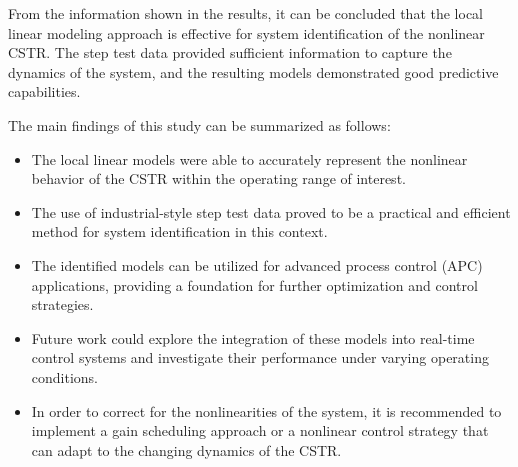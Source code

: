 From the information shown in the results, it can be concluded that the local linear modeling approach is effective for system identification of the nonlinear CSTR. The step test data provided sufficient information to capture the dynamics of the system, and the resulting models demonstrated good predictive capabilities.

The main findings of this study can be summarized as follows:

\begin{itemize}
    \item The local linear models were able to accurately represent the nonlinear behavior of the CSTR within the operating range of interest.
    \item The use of industrial-style step test data proved to be a practical and efficient method for system identification in this context.
    \item The identified models can be utilized for advanced process control (APC) applications, providing a foundation for further optimization and control strategies.
    \item Future work could explore the integration of these models into real-time control systems and investigate their performance under varying operating conditions.
    \item In order to correct for the nonlinearities of the system, it is recommended to implement a gain scheduling approach or a nonlinear control strategy that can adapt to the changing dynamics of the CSTR.
\end{itemize}